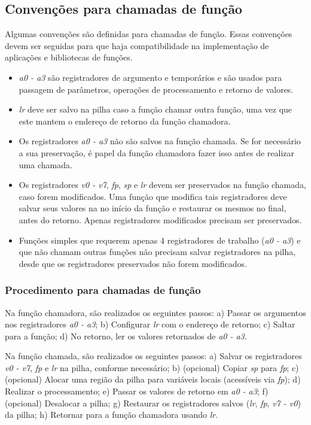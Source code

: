 \documentclass[11pt,a4paper]{report}
\begin{document}
\subsection{Convenções para chamadas de função}

Algumas convenções são definidas para chamadas de função. Essas
convenções devem ser seguidas para que haja compatibilidade na
implementação de aplicações e bibliotecas de funções.

\begin{itemize}
\item \textit{a0 - a3} são registradores de argumento e temporários e
são usados para passagem de parâmetros, operações de processamento e
retorno de valores.
\item \textit{lr} deve ser salvo na pilha caso a função chamar outra
função, uma vez que este mantem o endereço de retorno da função
chamadora.
\item Os registradores \textit{a0 - a3} não são salvos na função chamada.
Se for necessário a sua preservação, é papel da função chamadora fazer
isso antes de realizar uma chamada.
\item Os registradores \textit{v0 - v7}, \textit{fp}, \textit{sp} e
\textit{lr} devem ser preservados na função chamada, caso forem modificados.
Uma função que modifica tais registradores deve salvar seus valores na
no início da função e restaurar os mesmos no final, antes do retorno.
Apenas registradores modificados precisam ser preservados.
\item Funções simples que requerem apenas 4 registradores de trabalho
(\textit{a0 - a3}) e que não chamam outras funções não precisam salvar
registradores na pilha, desde que os registradores preservados não forem
modificados.
\end{itemize}

\subsubsection{Procedimento para chamadas de função}

Na função chamadora, são realizados os seguintes passos: a) Passar os
argumentos nos registradores \textit{a0 - a3}; b) Configurar \textit{lr}
com o endereço de retorno; c) Saltar para a função; d) No retorno, ler
os valores retornados de \textit{a0 - a3}.

Na função chamada, são realizados os seguintes passos: a) Salvar os
registradores \textit{v0 - v7}, \textit{fp} e \textit{lr} na pilha,
conforme necessário; b) (opcional) Copiar \textit{sp} para \textit{fp};
c) (opcional) Alocar uma região da pilha para variáveis locais
(acessíveis via \textit{fp}); d) Realizar o processamento; e) Passar os
valores de retorno em \textit{a0 - a3}; f) (opcional) Desalocar a pilha;
g) Restaurar os registradores salvos (\textit{lr}, \textit{fp},
\textit{v7 - v0}) da pilha; h) Retornar para a função chamadora usando
\textit{lr}.
\end{document}
